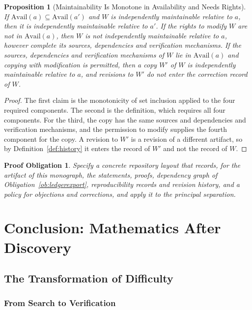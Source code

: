 \documentclass[11pt,letterpaper]{report}
\theoremstyle{plain}
\newtheorem{proposition}[theorem]{Proposition}
\newtheorem{obligation}[theorem]{Proof Obligation}
\theoremstyle{definition}
\theoremstyle{remark}
\begin{document}
\begin{proposition}[Maintainability Is Monotone in Availability and Needs Rights]\label{pr:maintmono}
If $\mathrm{Avail}(a)\subseteq\mathrm{Avail}(a')$ and $W$ is independently maintainable relative to $a$, then it is independently maintainable relative to $a'$. If the rights to modify $W$ are not in $\mathrm{Avail}(a)$, then $W$ is not independently maintainable relative to $a$, however complete its sources, dependencies and verification mechanisms. If the sources, dependencies and verification mechanisms of $W$ lie in $\mathrm{Avail}(a)$ and copying with modification is permitted, then a copy $W'$ of $W$ is independently maintainable relative to $a$, and revisions to $W'$ do not enter the correction record of $W$.
\end{proposition}
\begin{proof}
The first claim is the monotonicity of set inclusion applied to the four required components. The second is the definition, which requires all four components. For the third, the copy has the same sources and dependencies and verification mechanisms, and the permission to modify supplies the fourth component for the copy. A revision to $W'$ is a revision of a different artifact, so by Definition~\ref{def:history} it enters the record of $W'$ and not the record of $W$.
\end{proof}

\begin{obligation}\label{ob:repository}
Specify a concrete repository layout that records, for the artifact of this monograph, the statements, proofs, dependency graph of Obligation~\ref{ob:ledgerexport}, reproducibility records and revision history, and a policy for objections and corrections, and apply it to the principal separation.
\end{obligation}

\part{Conclusion: Mathematics After Discovery}

\chapter{The Transformation of Difficulty}

\section{From Search to Verification}
\end{document}

